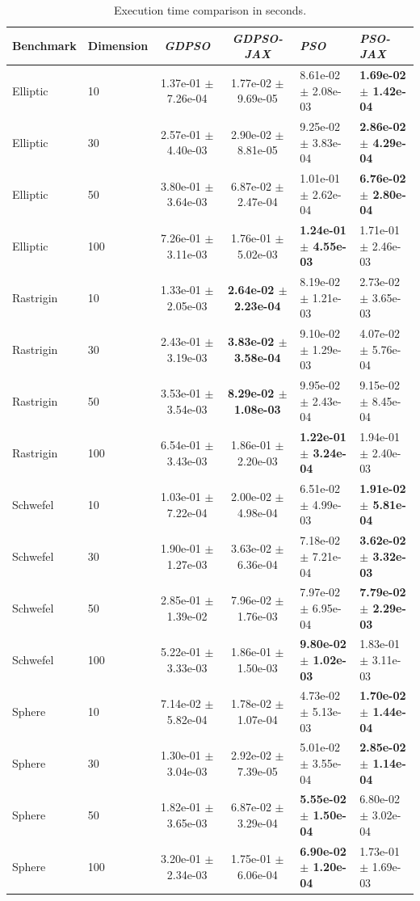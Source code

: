 \begin{table}[h]
\caption{Execution time comparison in seconds.}
\label{tab:execution_time}
\begin{tabular}{llcc}
\toprule
Benchmark & Dimension & \textit{GDPSO} & \textit{GDPSO-JAX} & \textit{PSO} & \textit{PSO-JAX} \\
\midrule
Elliptic & 10 & 1.37e-01 $\pm$ 7.26e-04 & 1.77e-02 $\pm$ 9.69e-05 & 8.61e-02 $\pm$ 2.08e-03 & \textbf{1.69e-02 $\pm$ 1.42e-04} \\
Elliptic & 30 & 2.57e-01 $\pm$ 4.40e-03 & 2.90e-02 $\pm$ 8.81e-05 & 9.25e-02 $\pm$ 3.83e-04 & \textbf{2.86e-02 $\pm$ 4.29e-04} \\
Elliptic & 50 & 3.80e-01 $\pm$ 3.64e-03 & 6.87e-02 $\pm$ 2.47e-04 & 1.01e-01 $\pm$ 2.62e-04 & \textbf{6.76e-02 $\pm$ 2.80e-04} \\
Elliptic & 100 & 7.26e-01 $\pm$ 3.11e-03 & 1.76e-01 $\pm$ 5.02e-03 & \textbf{1.24e-01 $\pm$ 4.55e-03} & 1.71e-01 $\pm$ 2.46e-03 \\
Rastrigin & 10 & 1.33e-01 $\pm$ 2.05e-03 & \textbf{2.64e-02 $\pm$ 2.23e-04} & 8.19e-02 $\pm$ 1.21e-03 & 2.73e-02 $\pm$ 3.65e-03 \\
Rastrigin & 30 & 2.43e-01 $\pm$ 3.19e-03 & \textbf{3.83e-02 $\pm$ 3.58e-04} & 9.10e-02 $\pm$ 1.29e-03 & 4.07e-02 $\pm$ 5.76e-04 \\
Rastrigin & 50 & 3.53e-01 $\pm$ 3.54e-03 & \textbf{8.29e-02 $\pm$ 1.08e-03} & 9.95e-02 $\pm$ 2.43e-04 & 9.15e-02 $\pm$ 8.45e-04 \\
Rastrigin & 100 & 6.54e-01 $\pm$ 3.43e-03 & 1.86e-01 $\pm$ 2.20e-03 & \textbf{1.22e-01 $\pm$ 3.24e-04} & 1.94e-01 $\pm$ 2.40e-03 \\
Schwefel & 10 & 1.03e-01 $\pm$ 7.22e-04 & 2.00e-02 $\pm$ 4.98e-04 & 6.51e-02 $\pm$ 4.99e-03 & \textbf{1.91e-02 $\pm$ 5.81e-04} \\
Schwefel & 30 & 1.90e-01 $\pm$ 1.27e-03 & 3.63e-02 $\pm$ 6.36e-04 & 7.18e-02 $\pm$ 7.21e-04 & \textbf{3.62e-02 $\pm$ 3.32e-03} \\
Schwefel & 50 & 2.85e-01 $\pm$ 1.39e-02 & 7.96e-02 $\pm$ 1.76e-03 & 7.97e-02 $\pm$ 6.95e-04 & \textbf{7.79e-02 $\pm$ 2.29e-03} \\
Schwefel & 100 & 5.22e-01 $\pm$ 3.33e-03 & 1.86e-01 $\pm$ 1.50e-03 & \textbf{9.80e-02 $\pm$ 1.02e-03} & 1.83e-01 $\pm$ 3.11e-03 \\
Sphere & 10 & 7.14e-02 $\pm$ 5.82e-04 & 1.78e-02 $\pm$ 1.07e-04 & 4.73e-02 $\pm$ 5.13e-03 & \textbf{1.70e-02 $\pm$ 1.44e-04} \\
Sphere & 30 & 1.30e-01 $\pm$ 3.04e-03 & 2.92e-02 $\pm$ 7.39e-05 & 5.01e-02 $\pm$ 3.55e-04 & \textbf{2.85e-02 $\pm$ 1.14e-04} \\
Sphere & 50 & 1.82e-01 $\pm$ 3.65e-03 & 6.87e-02 $\pm$ 3.29e-04 & \textbf{5.55e-02 $\pm$ 1.50e-04} & 6.80e-02 $\pm$ 3.02e-04 \\
Sphere & 100 & 3.20e-01 $\pm$ 2.34e-03 & 1.75e-01 $\pm$ 6.06e-04 & \textbf{6.90e-02 $\pm$ 1.20e-04} & 1.73e-01 $\pm$ 1.69e-03 \\
\bottomrule
\end{tabular}
\end{table}
